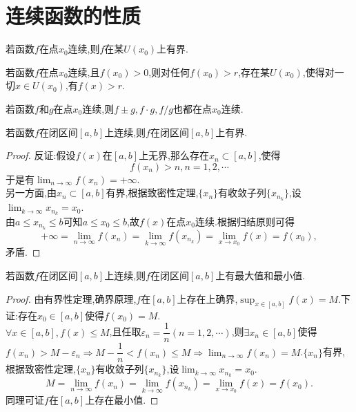\section{连续函数的性质}
\begin{theorem}[局部有界性]
    若函数$f$在点$x_0$连续,则$f$在某$U(x_0)$上有界.
\end{theorem}
\begin{theorem}[局部保号性]
    若函数$f$在点$x_0$连续,且$f(x_0)>0$,则对任何$f(x_0)>r$,存在某$U(x_0)$,使得对一切$x\in U(x_0)$,有$f(x)>r$.
\end{theorem}
\begin{theorem}
    若函数$f$和$g$在点$x_0$连续,则$f\pm g,f\cdot g,f/g$也都在点$x_0$连续.
\end{theorem}
\begin{theorem}[有界性定理]
    若函数$f$在闭区间$[a,b]$上连续,则$f$在闭区间$[a,b]$上有界.
\end{theorem}
\begin{proof}
    反证:假设$f(x)$在$[a,b]$上无界,那么存在$x_n\subset[a,b]$,使得
    \begin{equation*}
        f(x_n)>n,n=1,2,\cdots
    \end{equation*}
    于是有$\displaystyle\lim_{n\to\infty}f(x_n)=+\infty$.\\
    另一方面,由$x_n\subset[a,b]$有界,根据致密性定理,$\{x_n\}$有收敛子列$\{x_{n_k}\}$,设$\displaystyle\lim_{k\to\infty}x_{n_k}=x_0$.
    \\由$a\leq x_{n_k}\leq b$可知$a\leq x_0\leq b$,故$f(x)$在点$x_0$连续.根据归结原则可得
    \begin{equation*}
        +\infty=\displaystyle\lim_{n\to\infty}f(x_n)=\lim_{k\to\infty}f(x_{n_k})=\lim_{x\to x_0}f(x)=f(x_0),
    \end{equation*}
    矛盾.
\end{proof}
\begin{theorem}[最大,最小值定理]
    若函数$f$在闭区间$[a,b]$上连续,则$f$在闭区间$[a,b]$上有最大值和最小值.
\end{theorem}
\begin{proof}
    由有界性定理,确界原理,$f$在$[a,b]$上存在上确界,$\displaystyle\sup_{x\in[a,b]}f(x)=M$.下证:存在$x_0\in[a,b]$使得$f(x_0)=M$.\\
    $\forall x\in[a,b],f(x)\leq M$,且任取$\varepsilon_n=\dfrac{1}{n}(n=1,2,\cdots)$,则$\exists x_n\in[a,b]$使得$f(x_n)>M-\varepsilon_n\Rightarrow M-\dfrac{1}{n}<f(x_n)\leq M\Rightarrow\displaystyle\lim_{n\to\infty}f(x_n)=M$.$\{x_n\}$有界,根据致密性定理,$\{x_n\}$有收敛子列$\{x_{n_k}\}$,设$\displaystyle\lim_{k\to\infty}x_{n_k}=x_0$.
    \begin{equation*}
        \displaystyle M=\lim_{n\to\infty}f(x_n)=\lim_{k\to\infty}f(x_{n_k})=\lim_{x\to x_0}f(x)=f(x_0).
    \end{equation*}
    同理可证$f$在$[a,b]$上存在最小值.
\end{proof}
